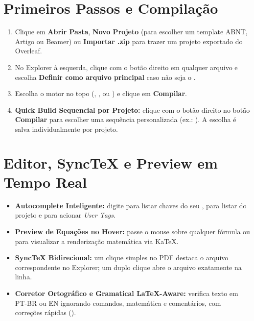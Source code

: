 \documentclass[11pt,a4paper]{article}
\begin{document}
\section{Primeiros Passos e Compilação}
\begin{enumerate}
  \item Clique em \textbf{Abrir Pasta}, \textbf{Novo Projeto} (para escolher um template ABNT, Artigo ou Beamer) ou \textbf{Importar .zip} para trazer um projeto exportado do Overleaf.
  \item No Explorer à esquerda, clique com o botão direito em qualquer arquivo  e escolha \textbf{Definir como arquivo principal} caso não seja o .
  \item Escolha o motor no topo (, ,  ou ) e clique em \textbf{Compilar}.
  \item \textbf{Quick Build Sequencial por Projeto:} clique com o botão direito no botão \textbf{Compilar} para escolher uma sequência personalizada (ex.: ). A escolha é salva individualmente por projeto.
\end{enumerate}

\section{Editor, SyncTeX e Preview em Tempo Real}
\begin{itemize}
  \item \textbf{Autocomplete Inteligente:} digite  para listar chaves do seu ,  para listar  do projeto e \code{:} para acionar \textit{User Tags}.
  \item \textbf{Preview de Equações no Hover:} passe o mouse sobre qualquer fórmula  ou  para visualizar a renderização matemática via KaTeX.
  \item \textbf{SyncTeX Bidirecional:} um clique simples no PDF destaca o arquivo correspondente no Explorer; um duplo clique abre o arquivo exatamente na linha.
  \item \textbf{Corretor Ortográfico e Gramatical LaTeX-Aware:} verifica texto em PT-BR ou EN ignorando comandos, matemática e comentários, com correções rápidas ().
\end{itemize}
\end{document}
